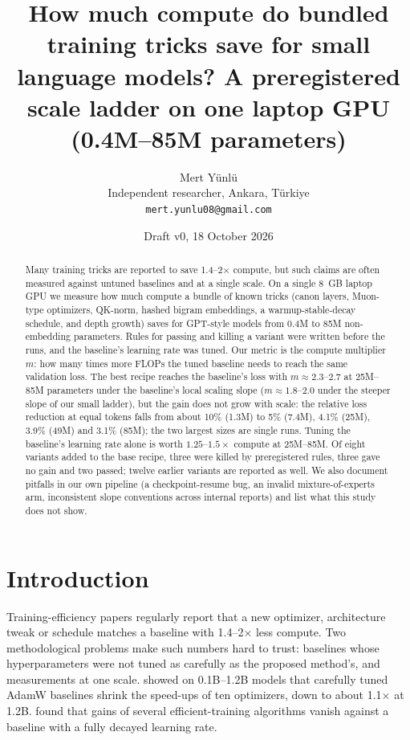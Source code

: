 \documentclass[11pt]{article}
\title{How much compute do bundled training tricks save for small language models? A preregistered scale ladder on one laptop GPU (0.4M--85M parameters)}
\author{Mert Y\"unl\"u\\Independent researcher, Ankara, T\"urkiye\\\texttt{mert.yunlu08@gmail.com}}
\date{Draft v0, 18 October 2026}
\begin{document}
\maketitle

\begin{abstract}
Many training tricks are reported to save 1.4--2$\times$ compute, but such claims are often measured against untuned baselines and at a single scale.
On a single 8~GB laptop GPU we measure how much compute a bundle of known tricks (canon layers, Muon-type optimizers, QK-norm, hashed bigram embeddings, a warmup-stable-decay schedule, and depth growth) saves for GPT-style models from 0.4M to 85M non-embedding parameters.
Rules for passing and killing a variant were written before the runs, and the baseline's learning rate was tuned.
Our metric is the compute multiplier $m$: how many times more FLOPs the tuned baseline needs to reach the same validation loss.
The best recipe reaches the baseline's loss with $m\approx2.3$--$2.7$ at 25M--85M parameters under the baseline's local scaling slope ($m\approx1.8$--$2.0$ under the steeper slope of our small ladder), but the gain does not grow with scale: the relative loss reduction at equal tokens falls from about 10\% (1.3M) to 5\% (7.4M), 4.1\% (25M), 3.9\% (49M) and 3.1\% (85M); the two largest sizes are single runs.
Tuning the baseline's learning rate alone is worth $1.25$--$1.5\times$ compute at 25M--85M.
Of eight variants added to the base recipe, three were killed by preregistered rules, three gave no gain and two passed; twelve earlier variants are reported as well.
We also document pitfalls in our own pipeline (a checkpoint-resume bug, an invalid mixture-of-experts arm, inconsistent slope conventions across internal reports) and list what this study does not show.
\end{abstract}

\section{Introduction}
Training-efficiency papers regularly report that a new optimizer, architecture tweak or schedule matches a baseline with 1.4--2$\times$ less compute.
Two methodological problems make such numbers hard to trust: baselines whose hyperparameters were not tuned as carefully as the proposed method's, and measurements at one scale.
\citet{wen2025fantastic} showed on 0.1B--1.2B models that carefully tuned AdamW baselines shrink the speed-ups of ten optimizers, down to about 1.1$\times$ at 1.2B.
\citet{kaddour2023notrain} found that gains of several efficient-training algorithms vanish against a baseline with a fully decayed learning rate.
\end{document}
